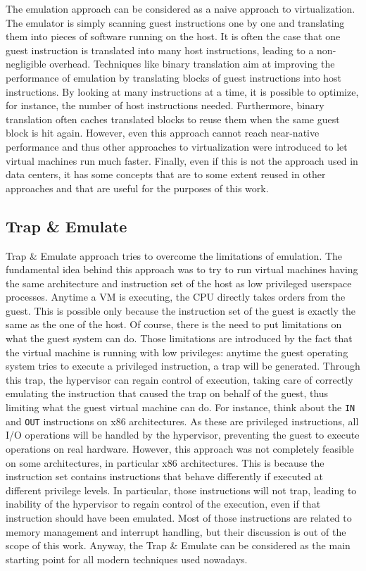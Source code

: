 \par The emulation approach can be considered as a naive approach to virtualization. The emulator is simply scanning guest instructions one by one and translating them into pieces of software running on the host. It is often the case that one guest instruction is translated into many host instructions, leading to a non-negligible overhead. Techniques like binary translation aim at improving the performance of emulation by translating blocks of guest instructions into host instructions. By looking at many instructions at a time, it is possible to optimize, for instance, the number of host instructions needed. Furthermore, binary translation often caches translated blocks to reuse them when the same guest block is hit again. However, even this approach cannot reach near-native performance and thus other approaches to virtualization were introduced to let virtual machines run much faster. Finally, even if this is not the approach used in data centers, it has some concepts that are to some extent reused in other approaches and that are useful for the purposes of this work. 

\subsection{Trap \& Emulate}
Trap \& Emulate approach tries to overcome the limitations of emulation. The fundamental idea behind this approach was to try to run virtual machines having the same architecture and instruction set of the host as low privileged userspace processes. Anytime a VM is executing, the CPU directly takes orders from the guest. This is possible only because the instruction set of the guest is exactly the same as the one of the host. Of course, there is the need to put limitations on what the guest system can do. Those limitations are introduced by the fact that the virtual machine is running with low privileges: anytime the guest operating system tries to execute a privileged instruction, a trap will be generated. Through this trap, the hypervisor can regain control of execution, taking care of correctly emulating the instruction that caused the trap on behalf of the guest, thus limiting what the guest virtual machine can do. For instance, think about the \texttt{IN} and \texttt{OUT} instructions on x86 architectures. As these are privileged instructions, all I/O operations will be handled by the hypervisor, preventing the guest to execute operations on real hardware. However, this approach was not completely feasible on some architectures, in particular x86 architectures. This is because the instruction set contains instructions that behave differently if executed at different privilege levels. In particular, those instructions will not trap, leading to inability of the hypervisor to regain control of the execution, even if that instruction should have been emulated. Most of those instructions are related to memory management and interrupt handling, but their discussion is out of the scope of this work. Anyway, the Trap \& Emulate can be considered as the main starting point for all modern techniques used nowadays.


